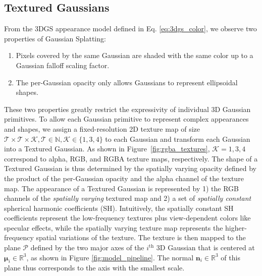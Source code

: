\subsection{Textured Gaussians}
From the 3DGS appearance model defined in Eq. \ref{eq:3dgs_color}, we observe two properties of Gaussian Splatting:
\begin{enumerate}
    \item Pixels covered by the same Gaussian are shaded with the same color up to a Gaussian falloff scaling factor.
    \item The per-Gaussian opacity only allows Gaussians to represent ellipsoidal shapes.
\end{enumerate}
These two properties greatly restrict the expressivity of individual 3D Gaussian primitives. To allow each Gaussian primitive to represent complex appearances and shapes, we assign a fixed-resolution 2D texture map of size $\mathcal{T} \times \mathcal{T} \times \mathcal{K}, \mathcal{T} \in \mathbb{N}, \mathcal{K} \in \{1, 3, 4\}$ to each Gaussian and transform each Gaussian into a Textured Gaussian. As shown in Figure~\ref{fig:rgba_textures}, $\mathcal{K} = 1, 3, 4$ correspond to alpha, RGB, and RGBA texture maps, respectively. 
The shape of a Textured Gaussian is thus determined by the spatially varying opacity defined by the product of the per-Gaussian opacity and the alpha channel of the texture map. 
The appearance of a Textured Gaussian is represented by 1) the RGB channels of the \emph{spatially varying} textured map and 2) a set of \emph{spatially constant} spherical harmonic coefficients (SH).
Intuitively, the spatially constant SH coefficients represent the low-frequency textures plus view-dependent colors like specular effects,
while the spatially varying texture map represents the higher-frequency spatial variations of the texture. The texture is then mapped to the plane $\mathcal{P}$ defined by the two major axes of the $i^\text{th}$ 3D Gaussian that is centered at $\bm{\mu}_i \in \mathbb{R}^3 $, as shown in Figure \ref{fig:model_pipeline}. The normal $\mathbf{n}_i \in \mathbb{R}^3$ of this plane thus corresponds to the axis with the smallest scale. 

